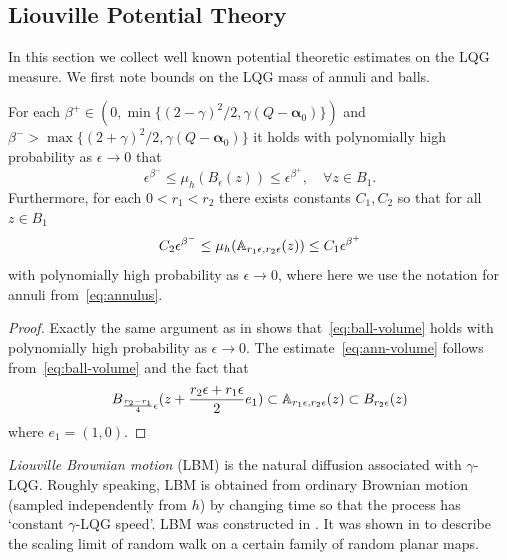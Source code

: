 \documentclass[12pt]{amsart}
\numberwithin{equation}{section}
\begin{document}
	
	\subsection{Liouville Potential Theory} \label{subsec:lqg-appendix}
	
	In this section we collect well known potential theoretic estimates on the LQG measure. 
	We first note bounds on the LQG mass of annuli and balls.   
	
	
	\begin{lemma} \label{lemma:volume-growth}
		For each $\beta^+ \in (0, \min\{(2 -\gamma)^2/2, \gamma(Q-\boldsymbol{\alpha}_0)\})$ and $\beta^- > \max\{(2+\gamma)^2/2, \gamma(Q-\boldsymbol{\alpha}_0)\}$ %
		it holds with polynomially high probability as $\epsilon \to 0$ that  
		\begin{equation} \label{eq:ball-volume}
		\epsilon^{\beta^-} \leq \mu_h(B_\epsilon(z)) \leq \epsilon^{\beta^+} ,\quad\forall z \in B_1 .
		\end{equation}
		Furthermore, for each $0 < r_1 < r_2$ there exists constants $C_1, C_2$ so that for all $z \in B_1$
		\begin{equation} \label{eq:ann-volume}
		C_2 \epsilon^{\beta^-} \leq \mu_h(\mathbb{A}_{r_1 \epsilon, r_2 \epsilon}(z)) \leq C_1 \epsilon^{\beta^+}
		\end{equation}
		with polynomially high probability as $\epsilon \to 0$, where here we use the notation for annuli from~\eqref{eq:annulus}.
	\end{lemma}
	\begin{proof}
		Exactly the same argument as in \cite[Lemma A.1]{berestycki2020random} shows that~\eqref{eq:ball-volume} holds with polynomially high probability as $\epsilon \to 0$. The estimate~\eqref{eq:ann-volume} follows from~\eqref{eq:ball-volume} and the fact that
		\[
		B_{\frac{r_2-r_1}{4} \epsilon}(z + \frac{r_2\epsilon+r_1\epsilon}{2}  e_1) \subset \mathbb{A}_{r_1 \epsilon, r_2 \epsilon}(z) \subset B_{r_2 \epsilon}(z)
		\]
		where $e_1 = (1,0)$. 
	\end{proof}
	
	
	
	\textit{Liouville Brownian motion} (LBM) is the natural diffusion associated with $\gamma$-LQG. Roughly speaking, LBM is obtained from ordinary Brownian motion (sampled independently from $h$) by changing time so that the process has `constant $\gamma$-LQG speed'. LBM was constructed in \cite{berestycki2015diffusion, garban2016liouville}. It was shown in \cite{berestycki2020random} to describe the scaling limit of random walk on a certain family of random planar maps. 
	
\end{document}
